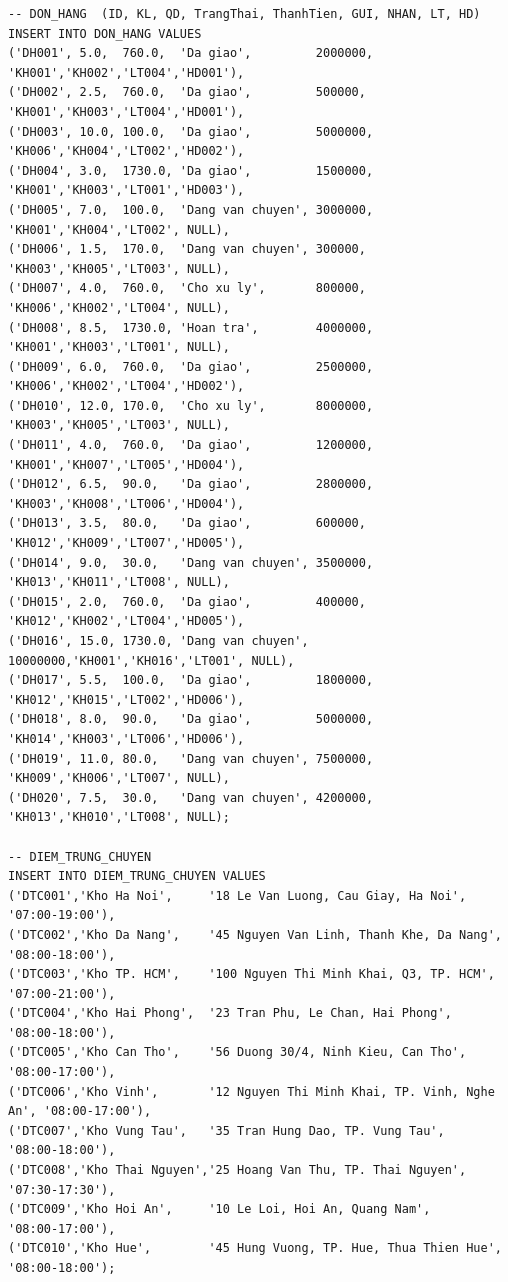 \documentclass[11pt]{report}
\begin{document}
\begin{verbatim}
-- DON_HANG  (ID, KL, QD, TrangThai, ThanhTien, GUI, NHAN, LT, HD)
INSERT INTO DON_HANG VALUES
('DH001', 5.0,  760.0,  'Da giao',         2000000, 'KH001','KH002','LT004','HD001'),
('DH002', 2.5,  760.0,  'Da giao',         500000,  'KH001','KH003','LT004','HD001'),
('DH003', 10.0, 100.0,  'Da giao',         5000000, 'KH006','KH004','LT002','HD002'),
('DH004', 3.0,  1730.0, 'Da giao',         1500000, 'KH001','KH003','LT001','HD003'),
('DH005', 7.0,  100.0,  'Dang van chuyen', 3000000, 'KH001','KH004','LT002', NULL),
('DH006', 1.5,  170.0,  'Dang van chuyen', 300000,  'KH003','KH005','LT003', NULL),
('DH007', 4.0,  760.0,  'Cho xu ly',       800000,  'KH006','KH002','LT004', NULL),
('DH008', 8.5,  1730.0, 'Hoan tra',        4000000, 'KH001','KH003','LT001', NULL),
('DH009', 6.0,  760.0,  'Da giao',         2500000, 'KH006','KH002','LT004','HD002'),
('DH010', 12.0, 170.0,  'Cho xu ly',       8000000, 'KH003','KH005','LT003', NULL),
('DH011', 4.0,  760.0,  'Da giao',         1200000, 'KH001','KH007','LT005','HD004'),
('DH012', 6.5,  90.0,   'Da giao',         2800000, 'KH003','KH008','LT006','HD004'),
('DH013', 3.5,  80.0,   'Da giao',         600000,  'KH012','KH009','LT007','HD005'),
('DH014', 9.0,  30.0,   'Dang van chuyen', 3500000, 'KH013','KH011','LT008', NULL),
('DH015', 2.0,  760.0,  'Da giao',         400000,  'KH012','KH002','LT004','HD005'),
('DH016', 15.0, 1730.0, 'Dang van chuyen', 10000000,'KH001','KH016','LT001', NULL),
('DH017', 5.5,  100.0,  'Da giao',         1800000, 'KH012','KH015','LT002','HD006'),
('DH018', 8.0,  90.0,   'Da giao',         5000000, 'KH014','KH003','LT006','HD006'),
('DH019', 11.0, 80.0,   'Dang van chuyen', 7500000, 'KH009','KH006','LT007', NULL),
('DH020', 7.5,  30.0,   'Dang van chuyen', 4200000, 'KH013','KH010','LT008', NULL);

-- DIEM_TRUNG_CHUYEN
INSERT INTO DIEM_TRUNG_CHUYEN VALUES
('DTC001','Kho Ha Noi',     '18 Le Van Luong, Cau Giay, Ha Noi',          '07:00-19:00'),
('DTC002','Kho Da Nang',    '45 Nguyen Van Linh, Thanh Khe, Da Nang',     '08:00-18:00'),
('DTC003','Kho TP. HCM',    '100 Nguyen Thi Minh Khai, Q3, TP. HCM',      '07:00-21:00'),
('DTC004','Kho Hai Phong',  '23 Tran Phu, Le Chan, Hai Phong',            '08:00-18:00'),
('DTC005','Kho Can Tho',    '56 Duong 30/4, Ninh Kieu, Can Tho',          '08:00-17:00'),
('DTC006','Kho Vinh',       '12 Nguyen Thi Minh Khai, TP. Vinh, Nghe An', '08:00-17:00'),
('DTC007','Kho Vung Tau',   '35 Tran Hung Dao, TP. Vung Tau',             '08:00-18:00'),
('DTC008','Kho Thai Nguyen','25 Hoang Van Thu, TP. Thai Nguyen',          '07:30-17:30'),
('DTC009','Kho Hoi An',     '10 Le Loi, Hoi An, Quang Nam',               '08:00-17:00'),
('DTC010','Kho Hue',        '45 Hung Vuong, TP. Hue, Thua Thien Hue',     '08:00-18:00');


\end{verbatim}
\end{document}
